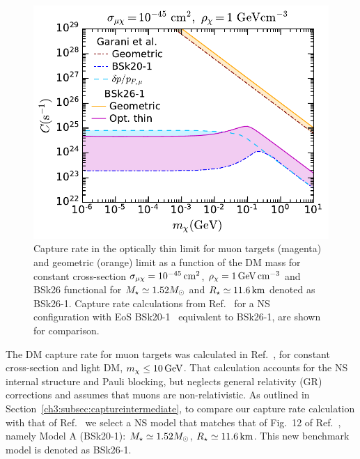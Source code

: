 \begin{figure}
    \centering
    \includegraphics[width=.7\textwidth]{capture_2/capture_rate_n0_comp_muons.pdf}
    \caption[Capture rate in the optically thin limit for muon targets as a function of the DM mass for a constant cross-section, $\sigma_{\mu\chi}=10^{-45}\cm^2$,  $\rho_\chi=1\GeV\cm^{-3}$ and BSk26 functional for $\Mstar\simeq1.52\Msun$ and $\Rstar\simeq11.6\km$ denoted as BSk26-1. Capture rate calculations from Ref.~\cite{Garani:2018kkd_may_NewAnalysisNeutron}.]{Capture rate in the optically thin limit for muon targets  (magenta) and geometric (orange) limit as a function of the DM mass for constant cross-section $\sigma_{\mu\chi}=10^{-45}\cm^2$,  $\rho_\chi=1\GeV\cm^{-3}$ and BSk26 functional for $\Mstar\simeq1.52\Msun$ and $\Rstar\simeq11.6\km$ denoted as BSk26-1. Capture rate calculations from Ref.~\cite{Garani:2018kkd_may_NewAnalysisNeutron} for a NS configuration with EoS BSk20-1~\cite{Potekhin:2013qqa_Analyticalrepresentationsunified} equivalent to BSk26-1, are shown for comparison. 
    }
    \label{ch4:fig:Cratecomp}
\end{figure}
  

The DM capture rate for muon targets was calculated in Ref.~\cite{Garani:2018kkd_may_NewAnalysisNeutron}, for constant cross-section and light DM, $m_\chi\leq10{\rm \,GeV}$. That calculation accounts for the NS internal structure and Pauli blocking, but neglects general relativity (GR) corrections and assumes that muons are non-relativistic. 
As outlined in Section~\ref{ch3:subsec:captureintermediate}, to compare our capture rate calculation with that of Ref.~\cite{Garani:2018kkd_may_NewAnalysisNeutron}  we select a NS model that matches that of Fig.~12 of Ref.~\cite{Garani:2018kkd_may_NewAnalysisNeutron}, namely Model A (BSk20-1):  $\Mstar\simeq1.52\Msun$, $\Rstar\simeq11.6\km$. This new benchmark model is denoted as BSk26-1.  

